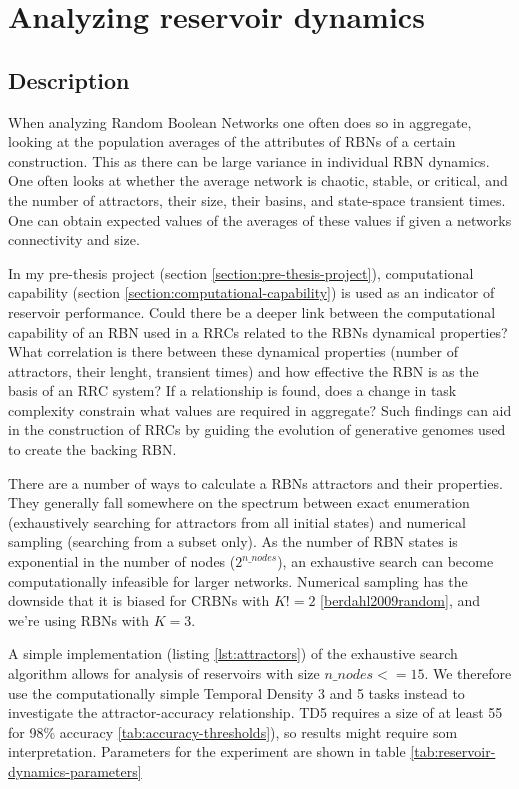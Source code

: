 \section{Analyzing reservoir dynamics}

\subsection{Description}

When analyzing Random Boolean Networks one often does so in aggregate,
looking at the population averages of the attributes of RBNs of a certain construction.
This as there can be large variance in individual RBN dynamics.
One often looks at whether the average network is chaotic, stable, or critical,
and the number of attractors, their size, their basins, and state-space transient times.
One can obtain expected values of the averages of these values if given a networks connectivity and size.

In my pre-thesis project (section \ref{section:pre-thesis-project}),
computational capability (section \ref{section:computational-capability}) is used as an indicator of reservoir performance.
Could there be a deeper link between the computational capability of an RBN used in a RRCs related to the RBNs dynamical properties?
What correlation is there between these dynamical properties (number of attractors, their lenght, transient times)
and how effective the RBN is as the basis of an RRC system?
If a relationship is found, does a change in task complexity constrain what values are required in aggregate?
Such findings can aid in the construction of RRCs by guiding the evolution of generative genomes used to create the backing RBN.

There are a number of ways to calculate a RBNs attractors and their properties.
They generally fall somewhere on the spectrum between exact enumeration (exhaustively searching for attractors from all initial states) and numerical sampling (searching from a subset only).
As the number of RBN states is exponential in the number of nodes ($ 2^{n\_nodes} $),
an exhaustive search can become computationally infeasible for larger networks.
Numerical sampling has the downside that it is biased for CRBNs with $ K != 2 $ \ref{berdahl2009random},
and we're using RBNs with $ K = 3$.

A simple implementation (listing \ref{lst:attractors}) of the exhaustive search algorithm allows for analysis of reservoirs with size $ n\_nodes <= 15 $.
We therefore use the computationally simple Temporal Density 3 and 5 tasks instead to investigate the attractor-accuracy relationship.
TD5 requires a size of at least 55 for 98\% accuracy \ref{tab:accuracy-thresholds}),
so results might require som interpretation.
Parameters for the experiment are shown in table \ref{tab:reservoir-dynamics-parameters}

